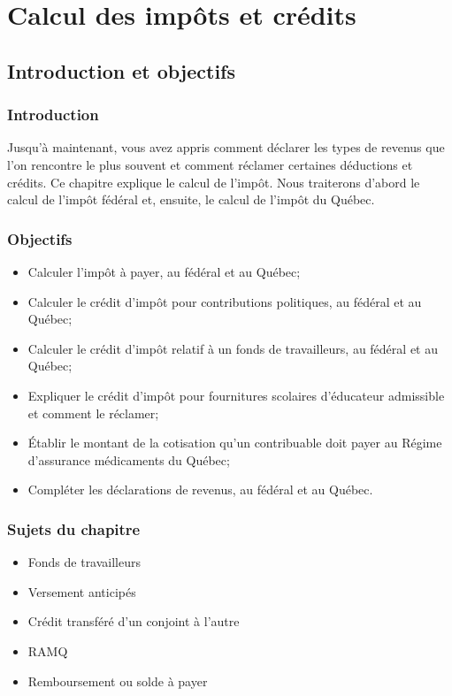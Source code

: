 \chapter{Calcul des impôts et crédits}
\section{Introduction et objectifs}
\subsection{Introduction}
Jusqu'à maintenant, vous avez appris comment déclarer les types de revenus que l'on rencontre le plus souvent et comment réclamer certaines déductions et crédits. Ce chapitre explique le calcul de l'impôt. Nous traiterons d'abord le calcul de l'impôt fédéral et, ensuite, le calcul de l'impôt du Québec.


\subsection{Objectifs}
\begin{itemize}
	\item Calculer l'impôt à payer, au fédéral et au Québec;
	\item Calculer le crédit d'impôt pour contributions politiques, au fédéral et au Québec;
	\item Calculer le crédit d'impôt relatif à un fonds de travailleurs, au fédéral et au Québec;
	\item Expliquer le crédit d'impôt pour fournitures scolaires d'éducateur admissible et comment le réclamer;
	\item Établir le montant de la cotisation qu'un contribuable doit payer au Régime d'assurance médicaments du Québec;
	\item Compléter les déclarations de revenus, au fédéral et au Québec.
\end{itemize}


\subsection{Sujets du chapitre}
\begin{itemize}
	\item Fonds de travailleurs
	\item Versement anticipés
	\item Crédit transféré d'un conjoint à l'autre
	\item RAMQ
	\item Remboursement ou solde à payer
\end{itemize}



